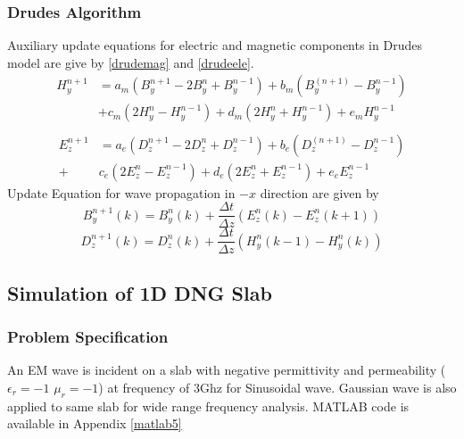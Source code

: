 
\subsubsection{Drudes Algorithm}
Auxiliary update equations for electric and magnetic components in Drudes model are give by \eqref{drudemag} and \eqref{drudeele}.
\begin{equation}
\begin{split}
	H_y^{n+1} &= a_m \left( B_y^{n+1} - 2B_y^n + B_y^{n-1} \right) + b_m \left( B_y^(n+1) - B_y^{n-1}  \right)\\
&+c_m \left( 2H_y^n-H_y^{n-1} \right) + d_m \left( 2H_y^n + H_y^{n-1} \right) +e_m H_y^{n-1}\\
\end{split}
\label{drudemag}
\end{equation}
\begin{equation}
\begin{split}
	E_z^{n+1} &= a_e \left( D_z^{n+1} - 2D_z^n + D_z^{n-1} \right) + b_e \left( D_z^(n+1) - D_z^{n-1}  \right)\\+ 
&c_e \left( 2E_z^n-E_z^{n-1} \right) + d_e \left( 2E_z^n + E_z^{n-1} \right) +e_e E_z^{n-1}
\label{drudeele}
\end{split}
\end{equation}
Update Equation for wave propagation in $-x$ direction are given by 
\begin{equation}
	B_y^{n+1}(k)=  B_y^{n} (k) + \frac {\Delta t}{\Delta z} \left( E_z^n (k) - E_z^n (k+1) \right)
\label{drudeby}
\end{equation}
\begin{equation}
	D_z^{n+1}(k)=  D_z^{n} (k) + \frac {\Delta t}{\Delta z} \left( H_y^n (k-1) - H_y^n (k) \right)
\label{drudedz}
\end{equation}

\subsection{Simulation of 1D DNG Slab}
\subsubsection{Problem Specification}
An EM wave is incident on a slab with negative permittivity and permeability ($\epsilon_r= -1$ $\mu_r= -1$) at frequency of 3Ghz for Sinusoidal wave. Gaussian wave is also applied to same slab for wide range frequency analysis. MATLAB code is available in 
Appendix \ref{matlab5}
